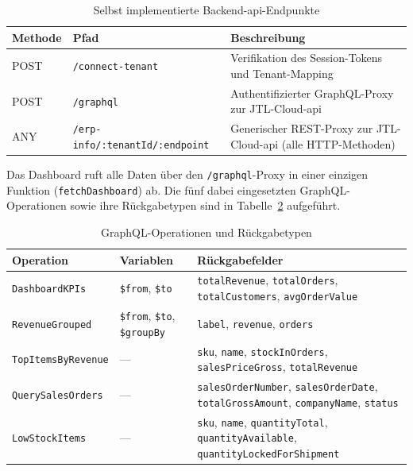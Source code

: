 \documentclass[11pt, a4paper, oneside]{report}
\begin{document}
\begin{table}[H]
  \centering
  \caption{Selbst implementierte Backend-\gls{api}-Endpunkte}
  \label{tab:api_endpunkte}
  \begin{tabularx}{\textwidth}{l l X}
    \toprule
    \textbf{Methode} & \textbf{Pfad} & \textbf{Beschreibung} \\
    \midrule
    POST & \texttt{/connect-tenant} & Verifikation des Session-Tokens und Tenant-Mapping \\
    POST & \texttt{/graphql} & Authentifizierter GraphQL-Proxy zur JTL-Cloud-\gls{api} \\
    ANY  & \texttt{/erp-info/:tenantId/:endpoint} & Generischer REST-Proxy zur JTL-Cloud-\gls{api} (alle HTTP-Methoden) \\
    \bottomrule
  \end{tabularx}
\end{table}

Das Dashboard ruft alle Daten über den \texttt{/graphql}-Proxy in einer einzigen
Funktion (\texttt{fetchDashboard}) ab. Die fünf dabei eingesetzten GraphQL-Operationen
sowie ihre Rückgabetypen sind in Tabelle~\ref{tab:datenmodell} aufgeführt.

\begin{table}[H]
  \centering
  \caption{GraphQL-Operationen und Rückgabetypen}
  \label{tab:datenmodell}
  \begin{tabularx}{\textwidth}{l l X}
    \toprule
    \textbf{Operation} & \textbf{Variablen} & \textbf{Rückgabefelder} \\
    \midrule
    \texttt{DashboardKPIs}      & \texttt{\$from}, \texttt{\$to}
      & \texttt{totalRevenue}, \texttt{totalOrders},
        \texttt{totalCustomers}, \texttt{avgOrderValue} \\
    \texttt{RevenueGrouped}     & \texttt{\$from}, \texttt{\$to}, \texttt{\$groupBy}
      & \texttt{label}, \texttt{revenue}, \texttt{orders} \\
    \texttt{TopItemsByRevenue}  & ---
      & \texttt{sku}, \texttt{name}, \texttt{stockInOrders},
        \texttt{salesPriceGross}, \texttt{totalRevenue} \\
    \texttt{QuerySalesOrders}   & ---
      & \texttt{salesOrderNumber}, \texttt{salesOrderDate},
        \texttt{totalGrossAmount}, \texttt{companyName}, \texttt{status} \\
    \texttt{LowStockItems}      & ---
      & \texttt{sku}, \texttt{name}, \texttt{quantityTotal},
        \texttt{quantityAvailable}, \texttt{quantityLockedForShipment} \\
    \bottomrule
  \end{tabularx}
\end{table}
\end{document}
